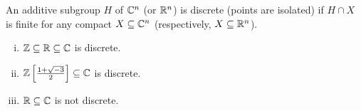 \begin{dfn}[Discrete]
An additive subgroup $H$ of $\mathbb{C}^n$ (or $\mathbb{R}^n$) is discrete (points are isolated) if $H \cap X$ is finite for any compact $X \subseteq \mathbb{C}^n$ (respectively, $X \subseteq \mathbb{R}^n$). 
\end{dfn}

\begin{ex} \hfill
	\begin{enumerate}[(i)]
	\item $\mathbb{Z} \subseteq \mathbb{R} \subseteq \mathbb{C}$ is discrete.
	\item $\mathbb{Z}\left[\frac{1+\sqrt{-3}}{2}\right] \subseteq \mathbb{C}$ is discrete.
	\item $\mathbb{R} \subseteq \mathbb{C}$ is not discrete. \xqed
	\end{enumerate} 
\end{ex}

